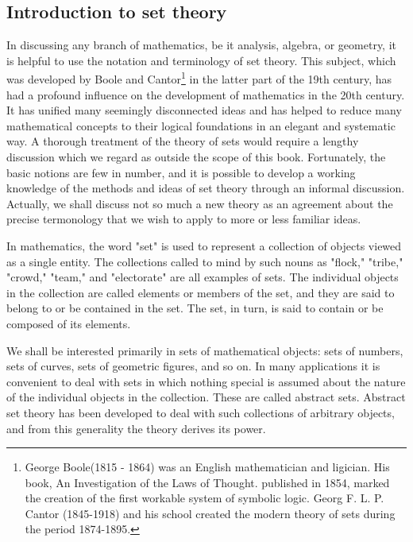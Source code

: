\documentclass[cn,11pt,chinese]{elegantbook}
\numberwithin{equation}{section}
\begin{document}
\subsection{Introduction to set theory}
In discussing any branch of mathematics, be it analysis, algebra, or geometry, it is helpful to use the notation and terminology of set theory. This subject, which was developed by Boole and Cantor\footnote{George Boole(1815 - 1864) was an English mathematician and ligician. His book, An Investigation of the Laws of Thought. published in 1854, marked the creation of the first workable system of symbolic logic. Georg F. L. P. Cantor (1845-1918) and his school created the modern theory of sets during the period 1874-1895.} in the latter part of the 19th century, has had a profound influence on the development of mathematics in the 20th century. It has unified many seemingly disconnected ideas and has helped to reduce many mathematical concepts to their logical foundations in an elegant and systematic way.  A thorough treatment of the theory of sets would require a lengthy discussion which we regard as outside the scope of this book. Fortunately, the basic notions are few in number, and it is possible to develop a working knowledge of the methods and ideas of set theory through an informal discussion. Actually, we shall discuss not so much a new theory as an agreement about the precise termonology that we wish to apply to more  or less familiar ideas.

In mathematics, the word "set" is used to represent a collection of objects viewed as a single entity. The collections called to mind by such nouns as "flock," "tribe," "crowd," "team," and "electorate" are all examples of sets. The individual objects in the collection are called elements or members of the set, and they are said to belong to or be contained in the set. The set, in turn, is said to contain or be composed of its elements.

We shall be interested primarily in sets of mathematical objects: sets of numbers, sets of curves, sets of geometric figures, and so on. In many applications it is convenient to deal with sets in which nothing special is assumed about the nature of the individual objects in the collection. These are called abstract sets. Abstract set theory has been developed to deal with such collections of arbitrary objects, and from this generality the theory derives its power.
\end{document}
